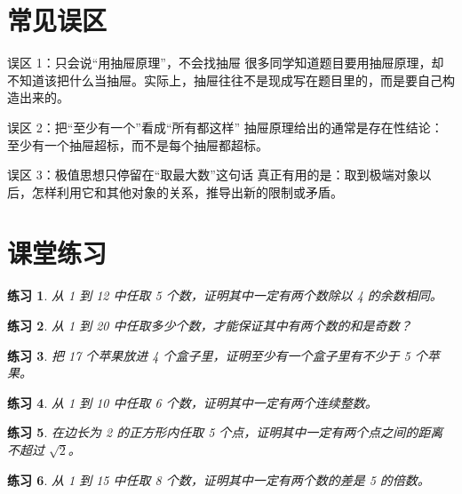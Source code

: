 \documentclass[11pt,a4paper,fontset=fandol]{ctexart}
\theoremstyle{formaltheorem}
\theoremstyle{formalexample}
\newtheorem{exercise}{练习}[section]
\begin{document}
\section{常见误区}

\begin{notebox}{误区 1：只会说“用抽屉原理”，不会找抽屉}
很多同学知道题目要用抽屉原理，却不知道该把什么当抽屉。实际上，抽屉往往不是现成写在题目里的，而是要自己构造出来的。
\end{notebox}

\begin{notebox}{误区 2：把“至少有一个”看成“所有都这样”}
抽屉原理给出的通常是存在性结论：至少有一个抽屉超标，而不是每个抽屉都超标。
\end{notebox}

\begin{notebox}{误区 3：极值思想只停留在“取最大数”这句话}
真正有用的是：取到极端对象以后，怎样利用它和其他对象的关系，推导出新的限制或矛盾。
\end{notebox}

\section{课堂练习}

\begin{exercise}
从 1 到 12 中任取 5 个数，证明其中一定有两个数除以 4 的余数相同。
\end{exercise}

\begin{exercise}
从 1 到 20 中任取多少个数，才能保证其中有两个数的和是奇数？
\end{exercise}

\begin{exercise}
把 17 个苹果放进 4 个盒子里，证明至少有一个盒子里有不少于 5 个苹果。
\end{exercise}

\begin{exercise}
从 1 到 10 中任取 6 个数，证明其中一定有两个连续整数。
\end{exercise}

\begin{exercise}
在边长为 2 的正方形内任取 5 个点，证明其中一定有两个点之间的距离不超过 $\sqrt{2}$。
\end{exercise}

\begin{exercise}
从 1 到 15 中任取 8 个数，证明其中一定有两个数的差是 5 的倍数。
\end{exercise}
\end{document}
